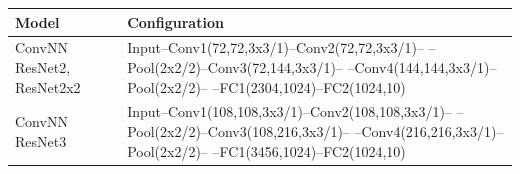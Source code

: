 \begin{tabular}{ll}
\toprule
Model & Configuration \\
\midrule
ConvNN ResNet2, ResNet2x2 & Input–Conv1(72,72,3x3/1)–Conv2(72,72,3x3/1)– –Pool(2x2/2)–Conv3(72,144,3x3/1)– –Conv4(144,144,3x3/1)–Pool(2x2/2)– –FC1(2304,1024)–FC2(1024,10) \\
ConvNN ResNet3 & Input–Conv1(108,108,3x3/1)–Conv2(108,108,3x3/1)– –Pool(2x2/2)–Conv3(108,216,3x3/1)– –Conv4(216,216,3x3/1)–Pool(2x2/2)– –FC1(3456,1024)–FC2(1024,10) \\
\bottomrule
\end{tabular}
